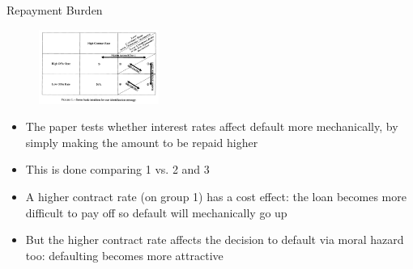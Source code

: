 \documentclass[11pt,notes=hide,aspectratio=169,mathserif]{beamer}
\begin{document}
\begin{frame}{Repayment Burden}
\begin{figure}
    \centering
    \includegraphics[width=0.35\textwidth]{inputs/main.png}
\end{figure}
\begin{itemize}
    \item The paper tests whether interest rates affect default more mechanically, by simply making the amount to be repaid higher
    \item This is done comparing 1 vs. 2 and 3
    \item A higher contract rate (on group 1) has a cost effect: the loan becomes more difficult to pay off so default will mechanically go up
    \item But the higher contract rate affects the decision to default via moral hazard too: defaulting becomes more attractive
\end{itemize}
\end{frame}
\end{document}
